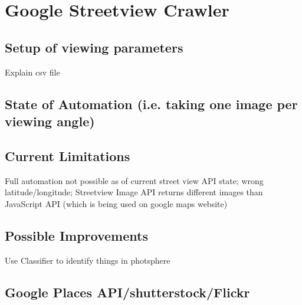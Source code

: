 \section{Google Streetview Crawler}
\subsection{Setup of viewing parameters}
Explain csv file

\subsection{State of Automation (i.e. taking one image per viewing angle)}

\subsection{Current Limitations}
Full automation not possible as of current street view API state; wrong latitude/longitude; Streetview Image API returns different images than JavaScript API (which is being used on google maps website)

\subsection{Possible Improvements}
Use Classifier to identify things in photsphere

\subsection{Google Places API/shutterstock/Flickr}